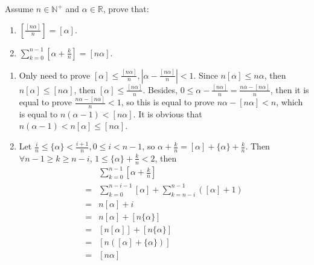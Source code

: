 \documentclass{ctexart}
\begin{document}
\begin{problem}\label{pro:p16.2}
  Assume \(n \in \mathbb{N}^+\) and \(\alpha \in \mathbb{R}\), prove that:
  \begin{enumerate}
    \item \(\left[\frac{[n \alpha]}{n}\right]=[\alpha]\).
    \item \(\sum_{k=0}^{n-1}[\alpha+\frac{k}{n}]=[n \alpha]\).
  \end{enumerate}
\end{problem}
\begin{solution}
  \begin{enumerate}
    \item Only need to prove \([\alpha] \leq \frac{[n \alpha]}{n}, |\alpha-\frac{[n \alpha]}{n}| <1\).
      Since \(n[\alpha] \leq n \alpha\), then \(n [\alpha] \leq [n \alpha]\), then \([\alpha]\leq \frac{[n \alpha]}{n}\).
      Besides, \(0 \leq \alpha-\frac{[n \alpha]}{n}=\frac{n \alpha-[n \alpha]}{n} \),
      then it is equal to prove \(\frac{n \alpha-[n \alpha]}{n} <1\), so this is equal to
      prove \(n \alpha- [n \alpha] < n\), which is equal to \(n(\alpha-1) < [n \alpha]\).
      It is obvious that \(n(\alpha-1) < n [\alpha] \leq [n \alpha]\).
    \item Let \(\frac{i}{n} \leq \{\alpha\} < \frac{i + 1}{n}, 0\leq i < n-1\),
      so \(\alpha + \frac{k}{n} = [\alpha] + \{\alpha\} + \frac{k}{n}\).
      Then \(\forall n-1 \geq k \geq n-i\), \(1 \leq \{\alpha\} + \frac{k}{n} <2\), then
      \begin{equation}
        \begin{aligned}
            & \sum_{k=0}^{n-1}[\alpha + \frac{k}{n}]                        \\
          = & \sum_{k=0}^{n-i-1}[\alpha ] + \sum_{k=n-i}^{n-1} ([\alpha]+1) \\
          = & n[\alpha]+i                                                   \\
          = & n[\alpha] + [n\{\alpha\}]                                     \\
          = & [n [\alpha]]+[n\{\alpha\}]                                    \\
          = & [n ([\alpha] +\{\alpha \})]                                   \\
          = & [n \alpha]\end{aligned}
      \end{equation}
  \end{enumerate}
\end{solution}
\end{document}
